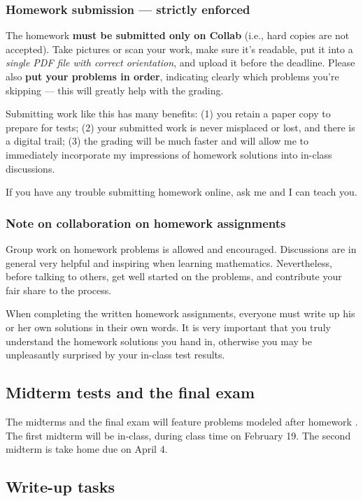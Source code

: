 \documentclass[oneside,11pt]{amsart}
\begin{document}
\subsubsection*{Homework submission --- strictly enforced}
The homework \textbf{must be submitted only on Collab} (i.e., hard copies are not accepted). 
Take pictures or scan your work,
make sure it's readable,
put it into a \emph{single PDF file with correct orientation},
and upload it before the deadline.
Please also \textbf{put your problems in order}, indicating clearly which problems you're skipping --- this will greatly help with the grading.

Submitting work like this has many benefits:
(1) you retain a paper copy to
prepare for tests; 
(2) your submitted work is never misplaced or lost, and there is a digital trail;
(3) the grading will be much faster and will allow me to immediately
incorporate my impressions of homework solutions into in-class
discussions. 

If you have any trouble submitting homework online, ask me and I can teach you.


\subsubsection*{Note on collaboration on homework assignments}
\label{collaboration}

Group work on homework problems is allowed and encouraged.
Discussions are in general very
helpful and inspiring when learning mathematics. 
Nevertheless, before talking to others, get well started
on the problems, and contribute your fair share to the process. 

When completing the written homework assignments, everyone must write up his or her own
solutions in their own words.
It is very important that you truly understand the homework solutions you hand
in, otherwise you may be unpleasantly surprised by your in-class test results.

\subsection{Midterm tests and the final exam}

The midterms and the final exam will feature 
problems modeled after homework .
The first midterm will be in-class, during class time on February 19. 
The second midterm is take home due on April 4.

\subsection{Write-up tasks}
\end{document}
